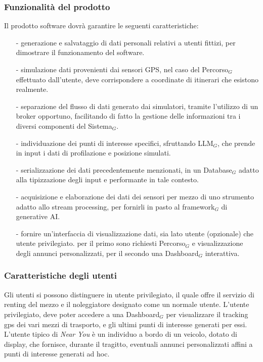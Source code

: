 \documentclass[10pt]{article}
\begin{document}
\begin{justify}
\subsubsection{Funzionalità del prodotto}
Il prodotto software dovrà garantire le seguenti caratteristiche:
\begin{itemize}
    \item [-] generazione e salvataggio di dati personali relativi a utenti fittizi, per dimostrare il funzionamento del software.
    \item [-] simulazione dati provenienti dai sensori GPS, nel caso del Percorso$_G$ effettuato dall'utente, deve corrispondere a coordinate di itinerari che esistono realmente.
    \item [-] separazione del flusso di dati generato dai simulatori, tramite l'utilizzo di un broker opportuno, facilitando di fatto la gestione delle informazioni tra i diversi componenti del Sistema$_G$.
    \item [-] individuazione dei punti di interesse specifici, sfruttando LLM$_G$, che prende in input i dati di profilazione e posizione simulati.
    \item [-] serializzazione dei dati precedentemente menzionati, in un Database$_G$ adatto alla tipizzazione degli input e performante in tale contesto.
    \item [-] acquisizione e elaborazione dei dati dei sensori per mezzo di uno strumento adatto allo stream processing, per fornirli in pasto al framework$_G$ di generative AI.
    \item [-] fornire un'interfaccia di visualizzazione dati, sia lato utente (opzionale) che utente privilegiato. per il primo sono richiesti Percorso$_G$ e visualizzazione degli annunci personalizzati, per il secondo una Dashboard$_G$ interattiva.
\end{itemize}

\subsubsection{Caratteristiche degli utenti}
Gli utenti si possono distinguere in utente privilegiato, il quale offre il servizio di renting del mezzo e il noleggiatore designato come un normale utente. L'utente privilegiato, deve poter accedere a una Dashboard$_G$ per visualizzare il tracking gps dei vari mezzi di trasporto, e gli ultimi punti di interesse generati per essi. L'utente tipico di \textit{Near You} è un individuo a bordo di un veicolo, dotato di display, che fornisce, durante il tragitto, eventuali annunci personalizzati affini a punti di interesse generati ad hoc.


\end{justify}
\end{document}
